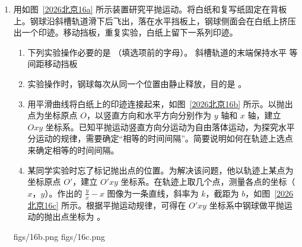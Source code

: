 \documentclass[\gkver]{gaokaozhenti}
\begin{document}
\begin{enumerate}
{\begin{enumerate}
	C．测量玻璃折射率时，两枚大头针间距适当大些，可以减小确定入射光线方向的角度误差，提高实验精度，C 正确。

	故选 AC。

	\item
	故障分析：图中导线 $c$ 直接将滑动变阻器的右上接线柱和开关相连，此时滑动变阻器的全部电阻被接入电路，相当于定值电阻，因此移动滑片时电路总电阻几乎不变，电表示数几乎不变。拆除多余的导线 $c$，滑动变阻器即可恢复正常的调节功能，排除故障，也可以拆除导线 $ac$，故答案为 $c$ 或 $ac$。

	误差分析：该电路为电流表外接法，电压表测量的是电阻丝的真实电压，但电流表测量的是电阻丝和电压表的总电流，电流测量值偏大。根据 $R=\frac{U}{I}$，电阻测量值偏小，再由电阻率公式 $\rho=\frac{RS}{L}$，因此电阻率的测量值偏小。
\end{enumerate}
}
\item
用如图~\ref{2026北京16a} 所示装置研究平抛运动。将白纸和复写纸固定在背板上。钢球沿斜槽轨道滑下后飞出，落在水平挡板上，钢球侧面会在白纸上挤压出一个印迹。移动挡板，重复实验，白纸上留下一系列印迹。
\begin{enumerate}
	\item
	下列实验操作必要的是 （填选项前的字母）。
	{斜槽轨道的末端保持水平}
	{等间距移动挡板}
	\item
	实验操作时，钢球每次从同一个位置由静止释放，目的是 。
	\item
	用平滑曲线将白纸上的印迹连接起来，如图~\ref{2026北京16b} 所示。以抛出点为坐标原点 $O$，以竖直方向和水平方向分别作为 $y$ 轴和 $x$ 轴，建立 $Oxy$ 坐标系。已知平抛运动竖直方向分运动为自由落体运动，为探究水平分运动的规律，需要确定“相等的时间间隔”。简要说明如何在轨迹上选点来确定相等的时间间隔。
	\item
	某同学实验时忘了标记抛出点的位置。为解决该问题，他以轨迹上某点为坐标原点 $O'$，建立 $O'xy$ 坐标系。在轨迹上取几个点，测量各点的坐标（$x$，$y$）。作出的 $\frac{y}{x}-x$ 图像为一条直线，斜率为 $k$，截距为 $b$，如图~\ref{2026北京16c} 所示。根据平抛运动规律，可得在 $O'xy$ 坐标系中钢球做平抛运动的抛出点坐标为 。
\end{enumerate}
{figs/16b.png}
{figs/16c.png}
\end{enumerate}
\end{document}
